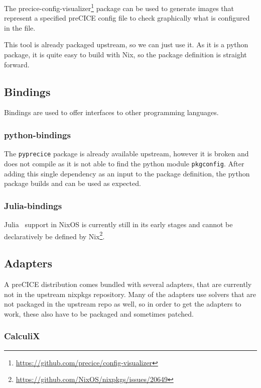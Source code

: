 \documentclass{eceasst}
\begin{document}
The precice-config-visualizer\footnote{\url{https://github.com/precice/config-visualizer}} package can be used to generate images that represent a specified preCICE config file to check graphically what is configured in the file.

This tool is already packaged upstream, so we can just use it.
As it is a python package, it is quite easy to build with Nix, so the package definition is straight forward.

\subsection{Bindings}

Bindings are used to offer interfaces to other programming languages.

\subsubsection{python-bindings}

The \texttt{pyprecice} package is already available upstream, however it is broken and does not compile as it is not able to find the python module \texttt{pkgconfig}.
After adding this single dependency as an input to the package definition, the python package builds and can be used as expected.

\subsubsection{Julia-bindings}

Julia~\cite{bezanson2017julia} support in NixOS is currently still in its early stages and cannot be declaratively be defined by Nix\footnote{\url{https://github.com/NixOS/nixpkgs/issues/20649}}.

\subsection{Adapters}

A preCICE distribution comes bundled with several adapters, that are currently not in the upstream nixpkgs repository.
Many of the adapters use solvers that are not packaged in the upstream repo as well, so in order to get the adapters to work, these also have to be packaged and sometimes patched.

\subsubsection{CalculiX}
\end{document}
